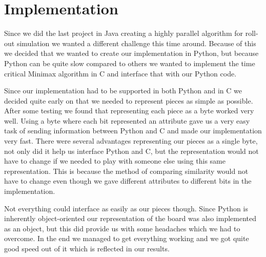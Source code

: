 \section{Implementation}\label{implementation}
Since we did the last project in Java creating a highly parallel algorithm for
roll-out simulation we wanted a different challenge this time around. Because
of this we decided that we wanted to create our implementation in Python, but
because Python can be quite slow compared to others we wanted to implement the
time critical Minimax algorithm in C and interface that with our Python code.

Since our implementation had to be supported in both Python and in C we decided
quite early on that we needed to represent pieces as simple as possible. After
some testing we found that representing each piece as a byte worked very well.
Using a byte where each bit represented an attribute gave us a very easy task
of sending information between Python and C and made our implementation very
fast. There were several advantages representing our pieces as a single byte,
not only did it help us interface Python and C, but the representation would
not have to change if we needed to play with someone else using this same
representation. This is because the method of comparing similarity would not
have to change even though we gave different attributes to different bits in
the implementation.

Not everything could interface as easily as our pieces though. Since Python is 
inherently object-oriented our representation of the \quarto{} board was also 
implemented as an object, but this did provide us with some headaches which we 
had to overcome.
In the end we managed to get everything working and we got quite good speed 
out of it which is reflected in our results.
